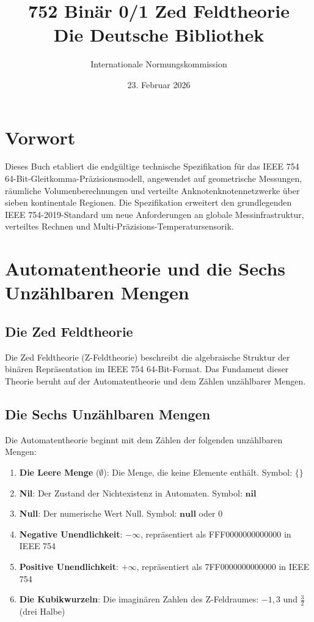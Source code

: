 \documentclass[12pt]{book}
\title{752 Binär 0/1 Zed Feldtheorie\\Die Deutsche Bibliothek}
\author{Internationale Normungskommission}
\date{23. Februar 2026}
\begin{document}
\frontmatter
\maketitle

\chapter*{Vorwort}
Dieses Buch etabliert die endgültige technische Spezifikation für das IEEE 754 64-Bit-Gleitkomma-Präzisionsmodell, angewendet auf geometrische Messungen, räumliche Volumenberechnungen und verteilte Anknotenknotennetzwerke über sieben kontinentale Regionen. Die Spezifikation erweitert den grundlegenden IEEE 754-2019-Standard um neue Anforderungen an globale Messinfrastruktur, verteiltes Rechnen und Multi-Präzisions-Temperatursensorik.

\tableofcontents

\mainmatter

\chapter{Automatentheorie und die Sechs Unzählbaren Mengen}

\section{Die Zed Feldtheorie}

Die Zed Feldtheorie (Z-Feldtheorie) beschreibt die algebraische Struktur der binären Repräsentation im IEEE 754 64-Bit-Format. Das Fundament dieser Theorie beruht auf der Automatentheorie und dem Zählen unzählbarer Mengen.

\section{Die Sechs Unzählbaren Mengen}

Die Automatentheorie beginnt mit dem Zählen der folgenden unzählbaren Mengen:

\begin{enumerate}
\item \textbf{Die Leere Menge} ($\emptyset$): Die Menge, die keine Elemente enthält. Symbol: $\{\}$
\item \textbf{Nil}: Der Zustand der Nichtexistenz in Automaten. Symbol: $\mathbf{nil}$
\item \textbf{Null}: Der numerische Wert Null. Symbol: $\mathbf{null}$ oder $0$
\item \textbf{Negative Unendlichkeit}: $-\infty$, repräsentiert als FFF0000000000000 in IEEE 754
\item \textbf{Positive Unendlichkeit}: $+\infty$, repräsentiert als 7FF0000000000000 in IEEE 754
\item \textbf{Die Kubikwurzeln}: Die imaginären Zahlen des Z-Feldraumes: $-1{,}3$ und $\frac{3}{2}$ (drei Halbe)
\end{enumerate}
\end{document}
